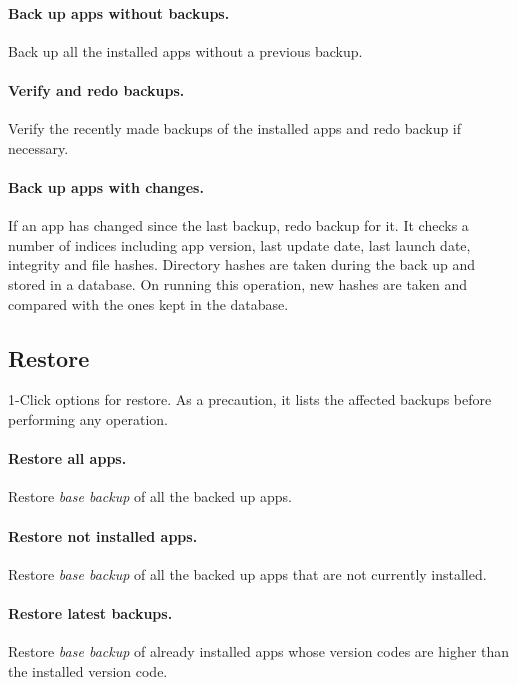\paragraph{Back up apps without backups.} Back up all the installed apps without a previous backup.

\paragraph{Verify and redo backups.} Verify the recently made backups of the installed apps and redo backup if necessary.

\paragraph{Back up apps with changes.} If an app has changed since the last backup, redo backup for it.
It checks a number of indices including app version, last update date, last launch date, integrity and file hashes.
Directory hashes are taken during the back up and stored in a database.
On running this operation, new hashes are taken and compared with the ones kept in the database.

\subsection{Restore}\label{subsec:1-click-restore}
1-Click options for restore.
As a precaution, it lists the affected backups before performing any operation.

\paragraph{Restore all apps.} Restore \textit{base backup} of all the backed up apps.

\paragraph{Restore not installed apps.} Restore \textit{base backup} of all the backed up apps that are not currently installed.

\paragraph{Restore latest backups.} Restore \textit{base backup} of already installed apps whose version codes are higher than the installed version code.
